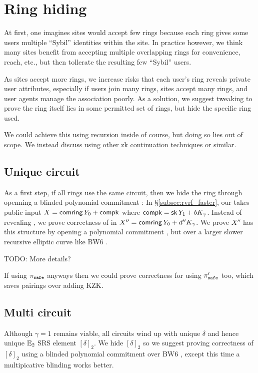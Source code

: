 \section{Ring hiding}%
\label{sec:ring_hiding}

At first, one imagines sites would accept few rings because each ring
gives some users multiple ``Sybil'' identities within the site.
In practice however, we think many sites benefit from accepting
multiple overlapping rings for convenience, reach, etc., but then
tollerate the resulting few ``Sybil'' users.

As sites accept more rings, we increase risks that each user's ring
\ctx reveals private user attributes, especially if
 users join many rings, sites accept many rings, and
 user agents manage the association poorly.
As a solution, we suggest tweaking \pifast to prove the ring itself
lies in some permitted set of rings, but hide the specific ring used.

We could achieve this using recursion inside \pifast of course,
but doing so lies out of scope.  We instead discuss using other
zk continuation techniques or similar.

\subsection{Unique circuit}

As a first step, if all rings use the same circuit, then we hide the
ring through openning a blinded polynomial commitment \cite{KZG}: 
In \S\ref{subsec:rvrf_faster}, our \pifast takes public input
 $X = \mathsf{comring}\, Y_0 + \mathsf{compk}$ where $\mathsf{compk} = \mathsf{sk}\, Y_1 + b K_\gamma$.
Instead of revealing \comring, we prove correctness of \comring in
 $X'' = \mathsf{comring}\, Y_0 + d'' K_\gamma$.
We prove $X''$ has this structure by opening a polynomial commitment
\cite{KZG}, but over a larger slower recursive elliptic curve
 like BW6 \cite{BW6}.

TODO: More details?

If using $\pi_{\mathtt{safe}}$ anyways then we could prove correctness for \comring
using $\pi_{\mathtt{safe}}'$ too, which saves pairings over adding KZK.

\subsection{Multi circuit}

Although $\gamma=1$ remains viable, all circuits wind up with
unique $\delta$ and hence unique ${\mathbb{E}}_2$ SRS element $[\delta]_2$.
We hide $[\delta]_2$ so we suggest proving correctness of $[\delta]_2$
using a blinded polynomial commitment \cite{KZG} over BW6 \cite{BW6},
except this time a multipicative blinding works better.


